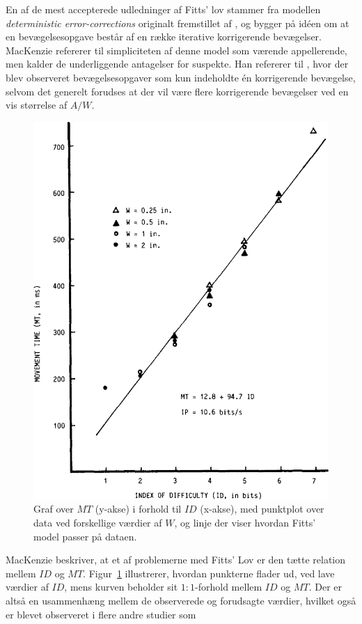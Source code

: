 En af de mest accepterede udledninger af Fitts' lov stammer fra modellen \emph{deterministic error-corrections} originalt fremstillet af \cite{crossman1983}, og bygger på idéen om at en bevægelsesopgave består af en række iterative korrigerende bevægelser. MacKenzie refererer til simpliciteten af denne model som værende appellerende, men kalder de underliggende antagelser for suspekte. Han refererer til \cite{langolf1976}, hvor der blev observeret bevægelsesopgaver som kun indeholdte én korrigerende bevægelse, selvom det generelt forudses at der vil være flere korrigerende bevægelser ved en vis størrelse af $A/W$.\\

\begin{figure}[h]
\centering
\includegraphics[width=.5\linewidth]{images/illustrations/mackenzie_plot_1}
\caption{Graf over $MT$ (y-akse) i forhold til $ID$ (x-akse), med punktplot over data ved forskellige værdier af $W$, og linje der viser hvordan Fitts' model passer på dataen.}
\label{fig:MacKenziePlot1}
\end{figure}
MacKenzie beskriver, at et af problemerne med Fitts' Lov er den tætte relation mellem $ID$ og $MT$. Figur~\ref{fig:MacKenziePlot1} illustrerer, hvordan punkterne flader ud, ved lave værdier af $ID$, mens kurven beholder sit $1:1$-forhold mellem $ID$ og $MT$. Der er altså en usammenhæng mellem de observerede og forudsagte værdier, hvilket også er blevet observeret i flere andre studier som \cite{welford1960, buck1986, crossman1983, drury1975, klapp1975, langolf1976, meyer1988, wallace1978}\\
